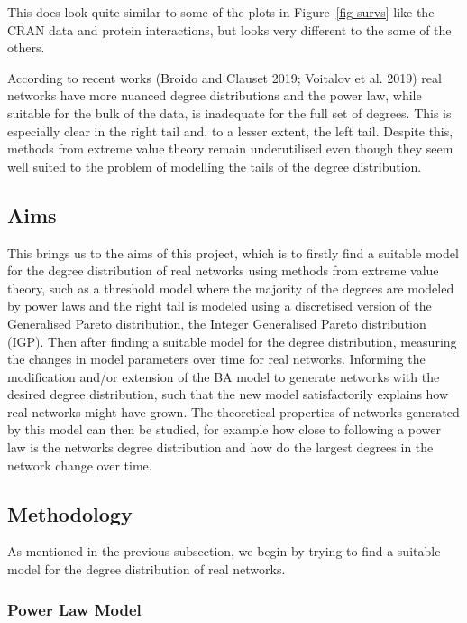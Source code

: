 \documentclass[
]{article}
\begin{document}
This does look quite similar to some of the plots in
Figure~\ref{fig-survs} like the CRAN data and protein interactions, but
looks very different to the some of the others.

According to recent works (Broido and Clauset 2019; Voitalov et al.
2019) real networks have more nuanced degree distributions and the power
law, while suitable for the bulk of the data, is inadequate for the full
set of degrees. This is especially clear in the right tail and, to a
lesser extent, the left tail. Despite this, methods from extreme value
theory remain underutilised even though they seem well suited to the
problem of modelling the tails of the degree distribution.

\hypertarget{aims}{%
\subsection{Aims}\label{aims}}

This brings us to the aims of this project, which is to firstly find a
suitable model for the degree distribution of real networks using
methods from extreme value theory, such as a threshold model where the
majority of the degrees are modeled by power laws and the right tail is
modeled using a discretised version of the Generalised Pareto
distribution, the Integer Generalised Pareto distribution (IGP). Then
after finding a suitable model for the degree distribution, measuring
the changes in model parameters over time for real networks. Informing
the modification and/or extension of the BA model to generate networks
with the desired degree distribution, such that the new model
satisfactorily explains how real networks might have grown. The
theoretical properties of networks generated by this model can then be
studied, for example how close to following a power law is the networks
degree distribution and how do the largest degrees in the network change
over time.

\hypertarget{methodology}{%
\subsection{Methodology}\label{methodology}}

As mentioned in the previous subsection, we begin by trying to find a
suitable model for the degree distribution of real networks.

\hypertarget{sec-pl}{%
\subsubsection{Power Law Model}\label{sec-pl}}
\end{document}
